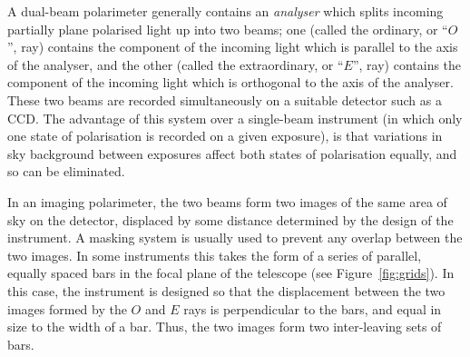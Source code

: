 A dual-beam polarimeter generally contains an {\em analyser} which splits
incoming partially plane polarised light up into two beams; one (called
the ordinary, or ``$O$'', ray) contains the component of the incoming
light which is parallel to the axis of the analyser, and the other
(called the extraordinary, or ``$E$'', ray) contains the component of the
incoming light which is orthogonal to the axis of the analyser. These two
beams are recorded simultaneously on a suitable detector such as a CCD.
The advantage of this system over a single-beam instrument (in which only
one state of polarisation is recorded on a given exposure), is that
variations in sky background between exposures affect both states of
polarisation equally, and so can be eliminated.

In an imaging polarimeter, the two beams form two images of the same area of
sky on the detector, displaced by some distance determined by the design
of the instrument. A masking system is usually used to prevent any
overlap between the two images. In some instruments this takes the form
of a series of parallel, equally spaced bars in the focal plane of the
telescope (see Figure~\ref{fig:grids}). In this case, the instrument is
designed so that the displacement between the two images formed by the
$O$ and $E$ rays is perpendicular to the bars, and equal in size to the
width of a bar. Thus, the two images form two inter-leaving sets of bars.

